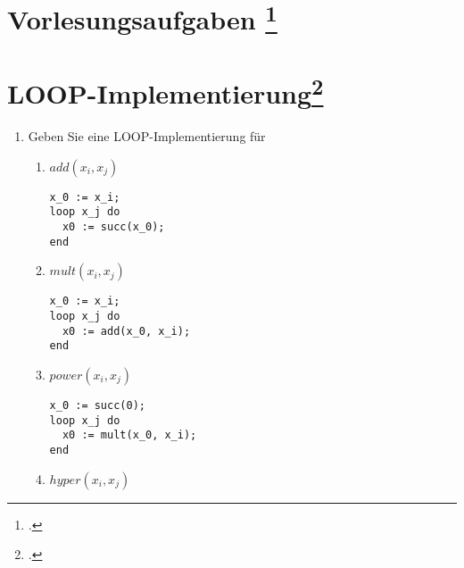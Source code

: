 \documentclass{lehramt-informatik-aufgabe}
\begin{document}
\section{Vorlesungsaufgaben
\footcite{theo:fs:4}}

%

\section{LOOP-Implementierung\footcite[Seite 11]{theo:fs:4}}

\begin{enumerate}
\item Geben Sie eine LOOP-Implementierung für

\begin{enumerate}

%

\item $add(x_i, x_j)$

\begin{liAntwort}
\begin{verbatim}
x_0 := x_i;
loop x_j do
  x0 := succ(x_0);
end
\end{verbatim}
\end{liAntwort}

%

\item $mult(x_i, x_j)$

\begin{liAntwort}
\begin{verbatim}
x_0 := x_i;
loop x_j do
  x0 := add(x_0, x_i);
end
\end{verbatim}
\end{liAntwort}

%

\item $power(x_i, x_j)$

\begin{liAntwort}
\begin{verbatim}
x_0 := succ(0);
loop x_j do
  x0 := mult(x_0, x_i);
end
\end{verbatim}
\end{liAntwort}

%

\item $hyper(x_i, x_j)$


\end{enumerate}
\end{enumerate}
\end{document}
